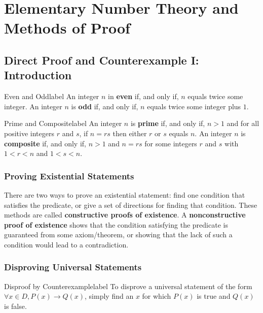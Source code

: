\documentclass[a4paper]{report}
\begin{document}
\chapter{Elementary Number Theory and Methods of Proof}

\section{Direct Proof and Counterexample I: Introduction}

\begin{definition}{Even and Odd}{label}
    An integer $n$ in \textbf{even} if, and only if, $n$ equals twice some integer. An integer $n$ is \textbf{odd} if, and only if,
    $n$ equals twice some integer plus $1$.
\end{definition}

\begin{definition}{Prime and Composite}{label}
    An integer $n$ is \textbf{prime} if, and only if, $n > 1$ and for all positive integers $r$ and $s$, if $n=rs$ then either
    $r$ or $s$ equals $n$. An integer $n$ is \textbf{composite} if, and only if, $n > 1$ and $n = rs$ for some integers
    $r$ and $s$ with $1 < r < n$ and $1 < s < n$.
\end{definition}

\subsection{Proving Existential Statements}

There are two ways to prove an existential statement: find one condition that satisfies the predicate,
or give a set of directions for finding that condition. These methods are called
\textbf{constructive proofs of existence}. A \textbf{nonconstructive proof of existence} shows that
the condition satisfying the predicate is guaranteed from some axiom/theorem, or showing that the lack
of such a condition would lead to a contradiction.

\subsection{Disproving Universal Statements}

\begin{definition}{Disproof by Counterexample}{label}
    To disprove a universal statement of the form $\forall x \in D, P(x) \to Q(x)$, simply find an
    $x$ for which $P(x)$ is true and $Q(x)$ is false.
\end{definition}
\end{document}
